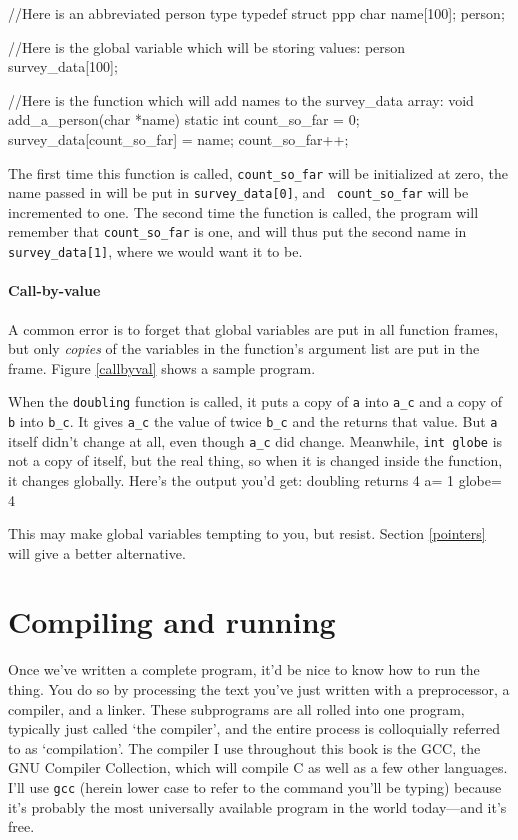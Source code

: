 \documentclass[12pt]{article}
\begin{document}
//Here is an abbreviated person type
typedef struct ppp{
    char name[100];
} person;

//Here is the global variable which will be storing values:
person survey_data[100];

//Here is the function which will add names to the survey_data array:
void add_a_person(char *name){
    static int count_so_far = 0;
    survey_data[count_so_far] = name;
    count_so_far++;
}

The first time this function is called, {\tt count\_so\_far} will be initialized
at zero, the name passed in will be put in {\tt survey\_data[0]}, and {\tt
count\_so\_far} will be incremented to one. The second time the function is
called, the program will remember that {\tt count\_so\_far} is one, and will thus
put the second name in {\tt survey\_data[1]}, where we would want it to be.


\paragraph{Call-by-value} 
A common error is to forget that global variables are put in all function frames,
but only {\sl copies} of the variables in the function's
argument list are put in the frame.  Figure \ref{callbyval} shows a sample program.


When the {\tt doubling} function is called, it puts a copy of {\tt a} into {\tt a\_c} and a copy of {\tt b}
into {\tt b\_c}. It gives {\tt a\_c} the value of twice {\tt b\_c} and the returns that value. But {\tt a}
itself didn't change at all, even though {\tt a\_c} did change. Meanwhile, {\tt int globe} is not a copy of
itself, but the real thing, so when it is changed inside the function, it changes globally.
Here's the output you'd get:
doubling returns 4
a= 1
globe= 4

This may make global variables tempting to you, but resist. Section \ref{pointers} will give a better
alternative.

\section{Compiling and running}

Once we've written a complete program, it'd be nice to know how to run the
thing. You do so by processing the text you've just written with a
preprocessor, a compiler, and a linker. These subprograms are all rolled
into one program, typically just called `the compiler', and the entire
process is colloquially referred to as `compilation'. The compiler I use
throughout this book is the GCC, the GNU Compiler Collection, which will
compile C as well as a few other languages. I'll use {\tt gcc} (herein
lower case to refer to the command you'll be typing) because it's probably
the most universally available program in the world today---and it's free.
\end{document}
